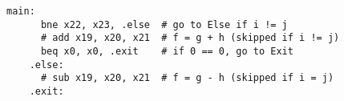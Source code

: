 \documentclass[varwidth]{standalone}
\begin{document}
\begin{BVerbatim}[gobble=4]
    main:
      bne x22, x23, .else  # go to Else if i != j
      # add x19, x20, x21  # f = g + h (skipped if i != j)
      beq x0, x0, .exit    # if 0 == 0, go to Exit
    .else:
      # sub x19, x20, x21  # f = g - h (skipped if i = j)
    .exit:
  \end{BVerbatim}
\end{document}
